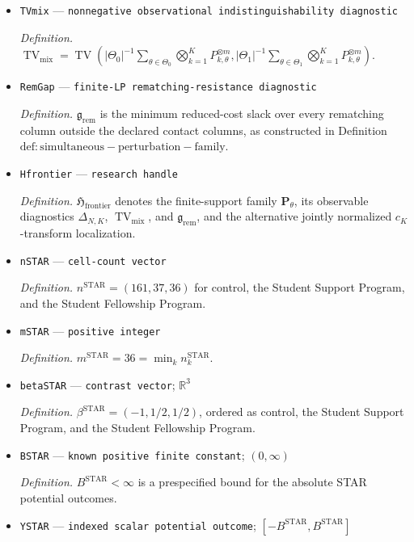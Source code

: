 \documentclass{article}
\begin{document}
\begin{itemize}
  \item \texttt{TVmix} --- \texttt{nonnegative observational indistinguishability diagnostic}
  \par\smallskip\noindent\emph{Definition.} \(\operatorname{TV}_{\mathrm{mix}}=\operatorname{TV}(|\Theta_0|^{-1}\sum_{\theta\in\Theta_0}\bigotimes_{k=1}^K P_{k,\theta}^{\otimes m},|\Theta_1|^{-1}\sum_{\theta\in\Theta_1}\bigotimes_{k=1}^K P_{k,\theta}^{\otimes m})\).
  \item \texttt{RemGap} --- \texttt{finite-\allowbreak{}LP rematching-\allowbreak{}resistance diagnostic}
  \par\smallskip\noindent\emph{Definition.} \(\mathfrak g_{\mathrm{rem}}\) is the minimum reduced-cost slack over every rematching column outside the declared contact columns, as constructed in Definition \(\mathrm{def:simultaneous-perturbation-family}\).
  \item \texttt{Hfrontier} --- \texttt{research handle}
  \par\smallskip\noindent\emph{Definition.} \(\mathfrak H_{\mathrm{frontier}}\) denotes the finite-support family \(\mathbf P_\theta\), its observable diagnostics \(\Delta_{N,K}\), \(\operatorname{TV}_{\mathrm{mix}}\), and \(\mathfrak g_{\mathrm{rem}}\), and the alternative jointly normalized \(c_K\)-transform localization.
  \item \texttt{nSTAR} --- \texttt{cell-\allowbreak{}count vector}
  \par\smallskip\noindent\emph{Definition.} \(n^{\mathrm{STAR}}=(161,37,36)\) for control, the Student Support Program, and the Student Fellowship Program.
  \item \texttt{mSTAR} --- \texttt{positive integer}
  \par\smallskip\noindent\emph{Definition.} \(m^{\mathrm{STAR}}=36=\min_k n_k^{\mathrm{STAR}}\).
  \item \texttt{betaSTAR} --- \texttt{contrast vector}; \(\mathbb R^3\)
  \par\smallskip\noindent\emph{Definition.} \(\beta^{\mathrm{STAR}}=(-1,1/2,1/2)\), ordered as control, the Student Support Program, and the Student Fellowship Program.
  \item \texttt{BSTAR} --- \texttt{known positive finite constant}; \((0,\infty)\)
  \par\smallskip\noindent\emph{Definition.} \(B^{\mathrm{STAR}}<\infty\) is a prespecified bound for the absolute STAR potential outcomes.
  \item \texttt{YSTAR} --- \texttt{indexed scalar potential outcome}; \([-B^{\mathrm{STAR}},B^{\mathrm{STAR}}]\)

\end{itemize}
\end{document}
